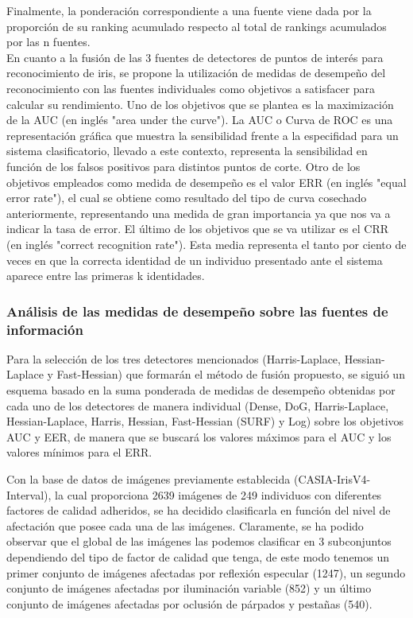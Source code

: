 Finalmente, la ponderación correspondiente a una fuente viene dada por la proporción de su ranking acumulado respecto al total de rankings acumulados por las n fuentes. \\

En cuanto a la fusión de las 3 fuentes de detectores de puntos de interés para reconocimiento de iris, se propone la utilización de medidas de desempeño del reconocimiento con las fuentes individuales como objetivos a satisfacer para calcular su rendimiento. Uno de los objetivos que se plantea es la maximización de la AUC (en inglés "area under the curve"). La AUC o Curva de ROC es una representación gráfica que muestra la sensibilidad frente a la especifidad para un sistema clasificatorio, llevado a este contexto, representa la sensibilidad en función de los falsos positivos para distintos puntos de corte. Otro de los objetivos empleados como medida de desempeño es el valor ERR (en inglés "equal error rate"), el cual se obtiene como resultado del tipo de curva cosechado anteriormente, representando una medida de gran importancia ya que nos va a indicar la tasa de error. El último de los objetivos que se va utilizar es el CRR (en inglés "correct recognition rate"). Esta media representa el tanto por ciento de veces en que la correcta identidad de un individuo presentado  ante el sistema aparece entre las primeras k identidades.  \\


\subsubsection{Análisis de las medidas de desempeño sobre las fuentes de información }
Para la selección de los tres detectores mencionados (Harris-Laplace, Hessian-Laplace y Fast-Hessian) que formarán el método de fusión propuesto, se siguió un esquema basado en la suma ponderada de medidas de desempeño obtenidas por cada uno de los detectores de manera individual (Dense, DoG, Harris-Laplace, Hessian-Laplace, Harris, Hessian, Fast-Hessian (SURF) y Log) sobre los objetivos AUC y EER, de manera que se buscará los valores máximos para el AUC y los valores mínimos para el ERR. 

Con la base de datos de imágenes previamente establecida (CASIA-IrisV4-Interval), la cual proporciona 2639 imágenes de 249 individuos con diferentes factores de calidad adheridos, se ha decidido clasificarla en función del nivel de afectación que posee cada una de las imágenes. Claramente, se ha podido observar que el global de las imágenes las podemos clasificar en 3 subconjuntos dependiendo del tipo de factor de calidad que tenga, de este modo tenemos un primer conjunto de imágenes afectadas por reflexión especular (1247), un segundo conjunto de imágenes afectadas por iluminación variable (852) y un último conjunto de imágenes afectadas por oclusión de párpados y pestañas (540). \\

